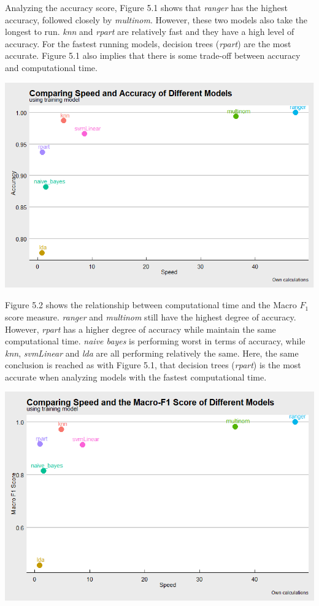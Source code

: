 \documentclass[11pt,preprint, authoryear]{elsarticle}
\let\origfigure\figure
\let\endorigfigure\endfigure
\renewenvironment{figure}[1][2] {
    \expandafter\origfigure\expandafter[H]
} {
    \endorigfigure
}
\numberwithin{equation}{section}
\numberwithin{figure}{section}
\numberwithin{table}{section}
\begin{document}
Analyzing the accuracy score, Figure 5.1 shows that \emph{ranger} has
the highest accuracy, followed closely by \emph{multinom}. However,
these two models also take the longest to run. \emph{knn} and
\emph{rpart} are relatively fast and they have a high level of accuracy.
For the fastest running models, decision trees (\emph{rpart}) are the
most accurate. Figure 5.1 also implies that there is some trade-off
between accuracy and computational time.

\begin{figure}
\centerline{\includegraphics[scale=0.65]{accuracy.png}}
\caption{Speed versus Accuracy}
\end{figure}

Figure 5.2 shows the relationship between computational time and the
Macro \(F_1\) score measure. \emph{ranger} and \emph{multinom} still
have the highest degree of accuracy. However, \emph{rpart} has a higher
degree of accuracy while maintain the same computational time.
\emph{naive bayes} is performing worst in terms of accuracy, while
\emph{knn}, \emph{svmLinear} and \emph{lda} are all performing
relatively the same. Here, the same conclusion is reached as with Figure
5.1, that decision trees (\emph{rpart}) is the most accurate when
analyzing models with the fastest computational time.

\begin{figure}
\centerline{\includegraphics[scale=0.65]{macroF1.png}}
\caption{Speed versus Macro F1 }
\end{figure}
\end{document}
